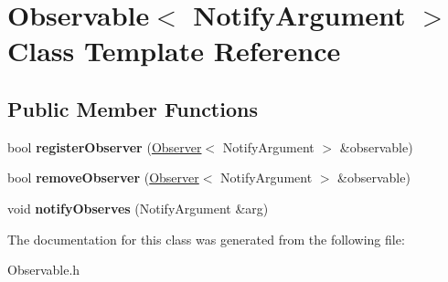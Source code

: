 \hypertarget{classObservable}{\section{Observable$<$ Notify\+Argument $>$ Class Template Reference}
\label{classObservable}
}
\subsection*{Public Member Functions}
\begin{DoxyCompactItemize}
\item 
\hypertarget{classObservable_a67b3bb2b5fbf3d29e1366f8e04115b6f}{bool {\bfseries register\+Observer} (\hyperlink{classObserver}{Observer}$<$ Notify\+Argument $>$ \&observable)}\label{classObservable_a67b3bb2b5fbf3d29e1366f8e04115b6f}

\item 
\hypertarget{classObservable_a93fca2f7da9fe212f8e27d299f3feddf}{bool {\bfseries remove\+Observer} (\hyperlink{classObserver}{Observer}$<$ Notify\+Argument $>$ \&observable)}\label{classObservable_a93fca2f7da9fe212f8e27d299f3feddf}

\item 
\hypertarget{classObservable_a48deae3a33d042b8eb2e3a0265b25e64}{void {\bfseries notify\+Observes} (Notify\+Argument \&arg)}\label{classObservable_a48deae3a33d042b8eb2e3a0265b25e64}

\end{DoxyCompactItemize}


The documentation for this class was generated from the following file\+:\begin{DoxyCompactItemize}
\item 
Observable.\+h\end{DoxyCompactItemize}
